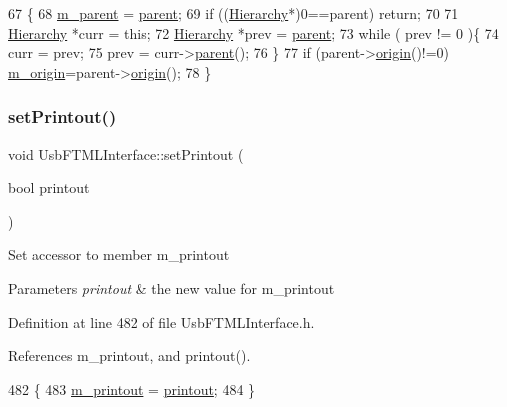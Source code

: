 \begin{DoxyCode}
67                                               \{
68   \hyperlink{classHierarchy_a5814bb280d4e8539ab25ab6cbfb9cc4f}{m\_parent} = \hyperlink{classHierarchy_a1c7bec8257e717f9c1465e06ebf845fc}{parent};
69   \textcolor{keywordflow}{if} ((\hyperlink{classHierarchy}{Hierarchy}*)0==parent) \textcolor{keywordflow}{return};
70 
71   \hyperlink{classHierarchy}{Hierarchy} *curr = \textcolor{keyword}{this};
72   \hyperlink{classHierarchy}{Hierarchy} *prev = \hyperlink{classHierarchy_a1c7bec8257e717f9c1465e06ebf845fc}{parent};
73   \textcolor{keywordflow}{while} ( prev != 0 )\{
74     curr = prev;
75     prev = curr->\hyperlink{classHierarchy_a1c7bec8257e717f9c1465e06ebf845fc}{parent}();
76   \}
77   \textcolor{keywordflow}{if} (parent->\hyperlink{classHierarchy_aee461dc930ce3871636ff87f075b1b83}{origin}()!=0) \hyperlink{classHierarchy_a16c73e557d3a7c156ffb5dc4102d148e}{m\_origin}=parent->\hyperlink{classHierarchy_aee461dc930ce3871636ff87f075b1b83}{origin}();
78 \}
\end{DoxyCode}
\mbox{\label{classUsbFTMLInterface_a807c9a67253303a7bc1b14558b9819ac}} 
\subsubsection{\texorpdfstring{set\+Printout()}{setPrintout()}}
{\footnotesize\ttfamily void Usb\+F\+T\+M\+L\+Interface\+::set\+Printout (\begin{DoxyParamCaption}\item[{bool}]{printout }\end{DoxyParamCaption})\hspace{0.3cm}{\ttfamily [inline]}}

Set accessor to member m\+\_\+printout 
\begin{DoxyParams}{Parameters}
{\em printout} & the new value for m\+\_\+printout \\
\hline
\end{DoxyParams}


Definition at line 482 of file Usb\+F\+T\+M\+L\+Interface.\+h.



References m\+\_\+printout, and printout().


\begin{DoxyCode}
482                                    \{
483     \hyperlink{classUsbFTMLInterface_a57b909e50c9eba8ffbcb66e0d9649632}{m\_printout} = \hyperlink{classUsbFTMLInterface_a1045e3851406cf07e31c498d0de230e1}{printout};
484   \}
\end{DoxyCode}
\mbox{\label{classUsbFTMLInterface_abdd0b79fb1d8a17c6a97969a291b858b}} 
